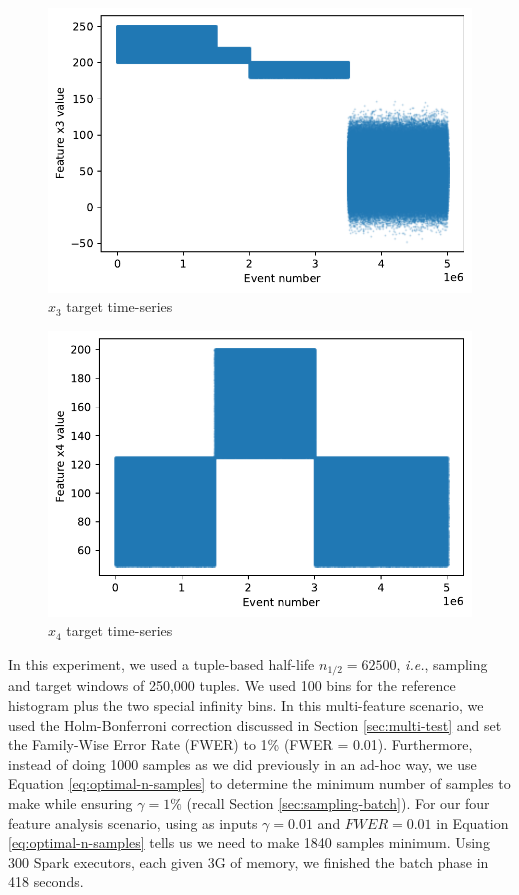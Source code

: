\documentclass[sigconf]{acmart}
\begin{document}
\begin{figure}[!htb]
    \begin{center}
      \includegraphics[scale=0.5]{figures/timeseries-t6-x3.pdf} 
      \caption{$x_3$ target time-series} 
      \label{fig:timeseries-t6-x3} 
    \end{center}
\end{figure}
\begin{figure}[!htb]
    \begin{center}
      \includegraphics[scale=0.5]{figures/timeseries-t6-x4.pdf} 
      \caption{$x_4$ target time-series} 
      \label{fig:timeseries-t6-x4} 
    \end{center}
\end{figure}
In this experiment, we used a tuple-based half-life $n_{1/2}=62500$, \textit{i.e.}, sampling and target windows of 250,000 tuples. We used 100 bins for the reference histogram plus the two special infinity bins. In this multi-feature scenario, we used the Holm-Bonferroni correction discussed in Section \ref{sec:multi-test} and set the Family-Wise Error Rate (FWER) to 1\% (FWER = 0.01). Furthermore, instead of doing 1000 samples as we did previously in an ad-hoc way, we use Equation \ref{eq:optimal-n-samples} to determine the minimum number of samples to make while ensuring $\gamma=1\%$ (recall Section \ref{sec:sampling-batch}). For our four feature analysis scenario, using as inputs  $\gamma=0.01$ and $FWER=0.01$ in Equation \ref{eq:optimal-n-samples} tells us we need to make 1840 samples minimum. Using 300 Spark executors, each given 3G of memory, we finished the batch phase in 418 seconds.
\end{document}

